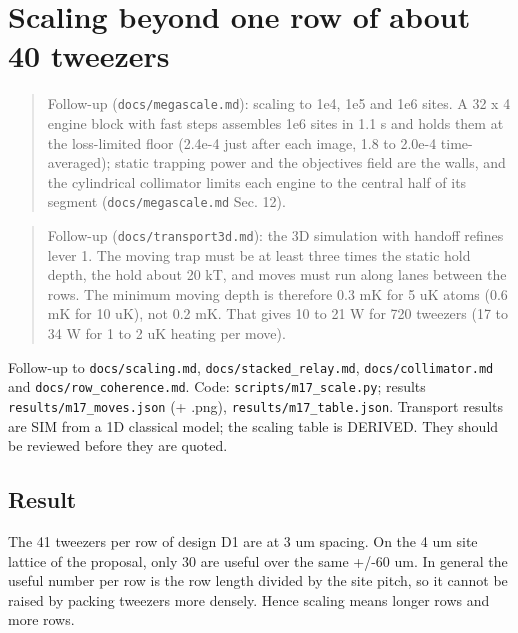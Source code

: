 \hypertarget{scaling-beyond-one-row-of-about-40-tweezers}{%
\chapter{Scaling beyond one row of about 40
tweezers}\label{scaling_beyond-scaling-beyond-one-row-of-about-40-tweezers}}

\begin{quote}
Follow-up (\texttt{docs/megascale.md}): scaling to 1e4, 1e5 and 1e6
sites. A 32 x 4 engine block with fast steps assembles 1e6 sites in 1.1
s and holds them at the loss-limited floor (2.4e-4 just after each
image, 1.8 to 2.0e-4 time-averaged); static trapping power and the
objective\textquotesingle s field are the walls, and the cylindrical
collimator limits each engine to the central half of its segment
(\texttt{docs/megascale.md} Sec. 12).
\end{quote}

\begin{quote}
Follow-up (\texttt{docs/transport3d.md}): the 3D simulation with handoff
refines lever 1. The moving trap must be at least three times the static
hold depth, the hold about 20 kT, and moves must run along lanes between
the rows. The minimum moving depth is therefore 0.3 mK for 5 uK atoms
(0.6 mK for 10 uK), not 0.2 mK. That gives 10 to 21 W for 720 tweezers
(17 to 34 W for 1 to 2 uK heating per move).
\end{quote}

Follow-up to \texttt{docs/scaling.md}, \texttt{docs/stacked\_relay.md},
\texttt{docs/collimator.md} and \texttt{docs/row\_coherence.md}. Code:
\texttt{scripts/m17\_scale.py}; results \texttt{results/m17\_moves.json}
(+ .png), \texttt{results/m17\_table.json}. Transport results are SIM
from a 1D classical model; the scaling table is DERIVED. They should be
reviewed before they are quoted.

\hypertarget{1-result}{%
\section{Result}\label{scaling_beyond-1-result}}

The 41 tweezers per row of design D1 are at 3 um spacing. On the 4 um
site lattice of the proposal, only 30 are useful over the same +/-60 um.
In general the useful number per row is the row length divided by the
site pitch, so it cannot be raised by packing tweezers more densely.
Hence scaling means longer rows and more rows.


